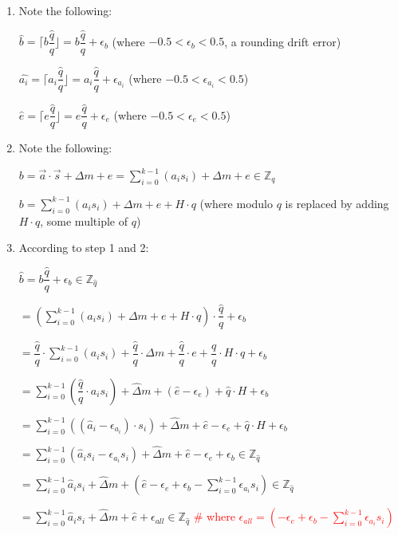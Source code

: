 \begin{myproof}
\begin{enumerate}
\item Note the following: 

$\hat{b} = \Big\lceil b \dfrac{\hat{q}}{q} \Big\rfloor = b\dfrac{\hat{q}}{q} + \epsilon_b$ (where $-0.5 < \epsilon_b < 0.5$, a rounding drift error)

$\hat{a_i} = \Big\lceil a_i \dfrac{\hat{q}}{q} \Big\rfloor = a_i\dfrac{\hat{q}}{q} + \epsilon_{a_i}$ (where $-0.5 < \epsilon_{a_i} < 0.5$)

$\hat{e} = \Big\lceil e \dfrac{\hat{q}}{q} \Big\rfloor = e\dfrac{\hat{q}}{q} + \epsilon_e$ (where $-0.5 < \epsilon_e < 0.5$)
\item Note the following: 

$b = \vec{a} \cdot \vec{s} + \Delta  m + e = \sum\limits_{i=0}^{k-1}(a_is_i) + \Delta m + e  \in \mathbb{Z}_q$

$b = \sum\limits_{i=0}^{k-1}(a_is_i) + \Delta m + e + H \cdot q$ (where modulo $q$ is replaced by adding $H \cdot q$, some multiple of $q$)

\item According to step 1 and 2:

$\hat{b} = b\dfrac{\hat{q}}{q} + \epsilon_b \in \mathbb{Z}_{\hat{q}}$

$= \left(\sum\limits_{i=0}^{k-1}(a_is_i) + \Delta m + e + H \cdot q\right) \cdot \dfrac{\hat{q}}{q}  + \epsilon_b$

$= \dfrac{\hat{q}}{q} \cdot \sum\limits_{i=0}^{k-1}(a_is_i) + \dfrac{\hat{q}}{q} \cdot \Delta m + \dfrac{\hat{q}}{q} \cdot e + \dfrac{\hat{q}}{q} \cdot H \cdot q + \epsilon_b$

$= \sum\limits_{i=0}^{k-1}\left(\dfrac{\hat{q}}{q} \cdot a_is_i\right) + \hat{\Delta} m + (\hat{e} - \epsilon_e) + \hat{q}\cdot H + \epsilon_b$

$= \sum\limits_{i=0}^{k-1}\left((\hat{a}_i - \epsilon_{a_i}) \cdot s_i\right) + \hat{\Delta} m + \hat{e} - \epsilon_e + \hat{q}\cdot H + \epsilon_b$

$= \sum\limits_{i=0}^{k-1}(\hat{a}_is_i - \epsilon_{a_i}s_i) + \hat{\Delta} m + \hat{e} - \epsilon_e + \epsilon_b \in \mathbb{Z}_{\hat{q}}$

$= \sum\limits_{i=0}^{k-1}\hat{a}_is_i + \hat{\Delta} m + \left( \hat{e} - \epsilon_e + \epsilon_b - \sum\limits_{i=0}^{k-1}\epsilon_{a_i}s_i \right) \in \mathbb{Z}_{\hat{q}}$

$= \sum\limits_{i=0}^{k-1}\hat{a}_is_i + \hat{\Delta} m + \hat{e} + \epsilon_{\textit{all}} \in \mathbb{Z}_{\hat{q}}$ \textcolor{red}{\#  where $\epsilon_{\textit{all}} = \left(- \epsilon_e + \epsilon_b - \sum\limits_{i=0}^{k-1}\epsilon_{a_i}s_i \right)$}


\end{enumerate}
\end{myproof}
